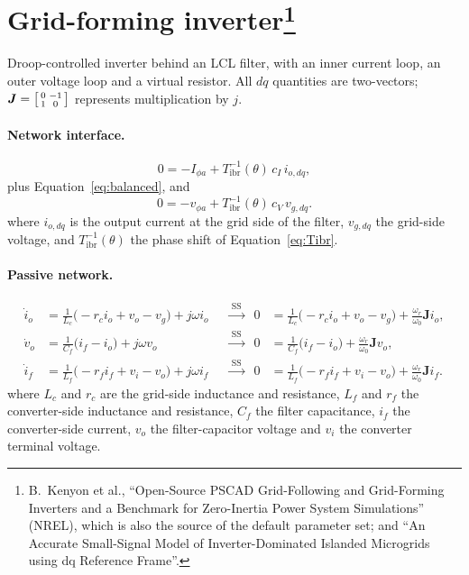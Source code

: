 \documentclass[11pt]{article}
\newcommand{\wnom}{\omega_0}
\newcommand{\wrot}{\omega_r}
\newcommand{\Jmat}{\bm{J}}
\begin{document}
\section[Grid-forming inverter]{Grid-forming
inverter\protect\footnote{B.~Kenyon et al., ``Open-Source PSCAD
Grid-Following and Grid-Forming Inverters and a Benchmark for Zero-Inertia
Power System Simulations'' (NREL), which is also the source of the default
parameter set; and ``An Accurate Small-Signal Model of Inverter-Dominated
Islanded Microgrids using dq Reference Frame''.}}

Droop-controlled inverter behind an LCL filter, with an inner current loop,
an outer voltage loop and a virtual resistor. All $dq$ quantities are
two-vectors; $\Jmat=\begin{bsmallmatrix}0&-1\\1&0\end{bsmallmatrix}$
represents multiplication by $j$.

\paragraph{Network interface.}
\begin{equation}
  0 = -I_{\phi a} + T_{\text{ibr}}^{-1}(\theta)\,c_I\, i_{o,dq},
\end{equation}
plus Equation~\eqref{eq:balanced}, and
\begin{equation}
  0 = -v_{\phi a} + T_{\text{ibr}}^{-1}(\theta)\,c_V\, v_{g,dq}.
\end{equation}
where $i_{o,dq}$ is the output current at the grid side of the filter,
$v_{g,dq}$ the grid-side voltage, and $T_{\text{ibr}}^{-1}(\theta)$ the
phase shift of Equation~\eqref{eq:Tibr}.

\paragraph{Passive network.}
\begin{align}
  \dot{i}_o &= \tfrac{1}{L_c}\big(-r_c i_o + v_o - v_g\big) + j\omega i_o
    &&\xrightarrow{\;\text{SS}\;}& 0 &= \tfrac{1}{L_c}\big(-r_c i_o + v_o - v_g\big) + \tfrac{\wrot}{\wnom}\Jmat i_o, \\
  \dot{v}_o &= \tfrac{1}{C_f}\big(i_f - i_o\big) + j\omega v_o
    &&\xrightarrow{\;\text{SS}\;}& 0 &= \tfrac{1}{C_f}\big(i_f - i_o\big) + \tfrac{\wrot}{\wnom}\Jmat v_o, \\
  \dot{i}_f &= \tfrac{1}{L_f}\big(-r_f i_f + v_i - v_o\big) + j\omega i_f
    &&\xrightarrow{\;\text{SS}\;}& 0 &= \tfrac{1}{L_f}\big(-r_f i_f + v_i - v_o\big) + \tfrac{\wrot}{\wnom}\Jmat i_f .
\end{align}
where $L_c$ and $r_c$ are the grid-side inductance and resistance, $L_f$
and $r_f$ the converter-side inductance and resistance, $C_f$ the filter
capacitance, $i_f$ the converter-side current, $v_o$ the filter-capacitor
voltage and $v_i$ the converter terminal voltage.
\end{document}
